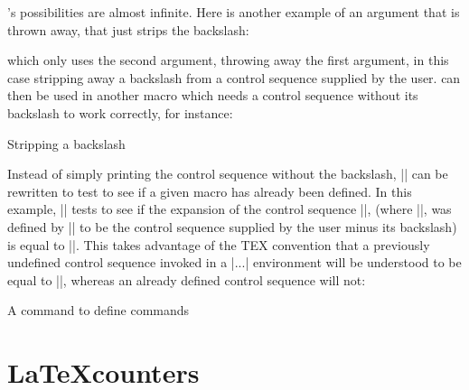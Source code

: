 \tex's possibilities are almost infinite. Here is another example of
an argument that is thrown away\cite{amy1990}, that just strips the backslash:

\begin{teXXX}
\def\stripbackslash#1#2*{\def\one{#2}}
\end{teXXX}

which only uses the second argument, throwing away the
first argument, in this case stripping away a backslash
from a control sequence supplied by the user. 
can then be used in another macro which
needs a control sequence without its backslash to work
correctly, for instance:

\begin{texexample}{Stripping a backslash}{}
\def\stripbackslash#1#2*{\def\one{#2}}
\def\newdef#1{\expandafter
\stripbackslash\string#1* \one}

\newdef\testmacro
\end{texexample}



Instead of simply printing the control sequence without
the backslash, |\newdef| can be rewritten to test to see
if a given macro has already been defined. In this example,
|\newdef| tests to see if the expansion of the control
sequence |\csname\one\endcsname|, (where |\one|,
was defined by |\stripbackslash| to be the control sequence
supplied by the user minus its backslash) is equal
to |\relax|. This takes advantage of the TEX convention
that a previously undefined control sequence invoked in
a |\csname...\endcsname| environment will be understood
to be equal to |\relax|, whereas an already defined
control sequence will not:

\begin{texexample}{A command to define commands}{}
\def\newdef#1{%
  \expandafter\stripbackslash\string#1*
  \expandafter
  \ifx\csname\one\endcsname\relax
  \else %
    {\tt Sorry, \string#1 has already been
     defined. Please supply a new name.}
\fi}
\end{texexample}


\chapter{\LaTeX counters}

